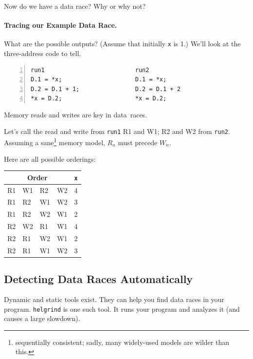\documentclass[11pt]{article}
\begin{document}
Now do we have a data race? Why or why not?
\vspace*{2em}


\paragraph{Tracing our Example Data Race.} 
What are the possible outputs? (Assume that initially {\tt *x} is 1.)
We'll look at the three-address code to tell.

\hspace*{.2\textwidth}\begin{minipage}{.8\textwidth}
\begin{lstlisting}[numbers=left]
run1                          run2   
D.1 = *x;                     D.1 = *x;
D.2 = D.1 + 1;                D.2 = D.1 + 2
*x = D.2;                     *x = D.2;
  \end{lstlisting}
\end{minipage}

Memory reads and writes are key in data~races.

Let's call the read and write from {\tt run1} R1 and W1; R2 and W2
from {\tt run2}. Assuming a sane\footnote{sequentially consistent; sadly, many
widely-used models are wilder than this.}
memory model, $R_n$ must precede $W_n$.

\newpage
Here are all possible orderings:
  \begin{center}
    \begin{tabular}{llll|l}
\multicolumn{4}{c|}{Order} & {\tt *x}\\
\hline
R1 & W1 & R2 & W2 & 4 \\
R1 & R2 & W1 & W2 & 3 \\
R1 & R2 & W2 & W1 & 2 \\
R2 & W2 & R1 & W1 & 4 \\
R2 & R1 & W2 & W1 & 2 \\
R2 & R1 & W1 & W2 & 3 \\
    \end{tabular}
  \end{center}

\subsection*{Detecting Data Races Automatically}  
Dynamic and static tools exist. They can help you find data races in
your program. {\tt helgrind} is one such tool. It runs your program 
and analyzes it (and causes a large slowdown).
\end{document}
